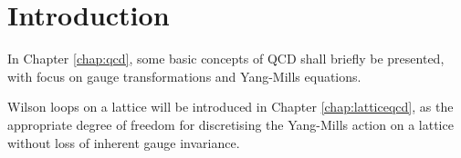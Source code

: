 \chapter*{Introduction}

In Chapter \cref{chap:qcd}, some basic concepts of {\sffamily QCD} shall briefly be presented, with focus on gauge transformations and Yang-Mills equations.

Wilson loops on a lattice will be introduced in Chapter \cref{chap:latticeqcd}, as the appropriate degree of freedom for discretising the Yang-Mills action on a lattice without loss of inherent gauge invariance.

